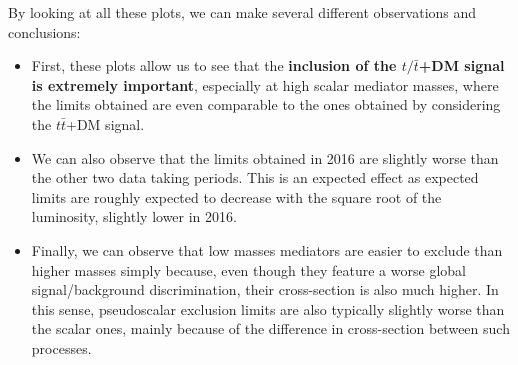 \documentclass[a4paper, 10pt, openright]{report}
\begin{document}
By looking at all these plots, we can make several different observations and conclusions:
\begin{itemize}
\item First, these plots allow us to see that the \textbf{inclusion of the $t/\bar t$+DM signal is extremely important}, especially at high scalar mediator masses, where the limits obtained are even comparable to the ones obtained by considering the $t \bar t$+DM signal.
\item We can also observe that the limits obtained in 2016 are slightly worse than the other two data taking periods. This is an expected effect as expected limits are roughly expected to decrease with the square root of the luminosity, slightly lower in 2016.
\item Finally, we can observe that low masses mediators are easier to exclude than higher masses simply because, even though they feature a worse global signal/background discrimination, their cross-section is also much higher. In this sense, pseudoscalar exclusion limits are also typically slightly worse than the scalar ones, mainly because of the difference in cross-section between such processes.
\end{itemize}
\end{document}
